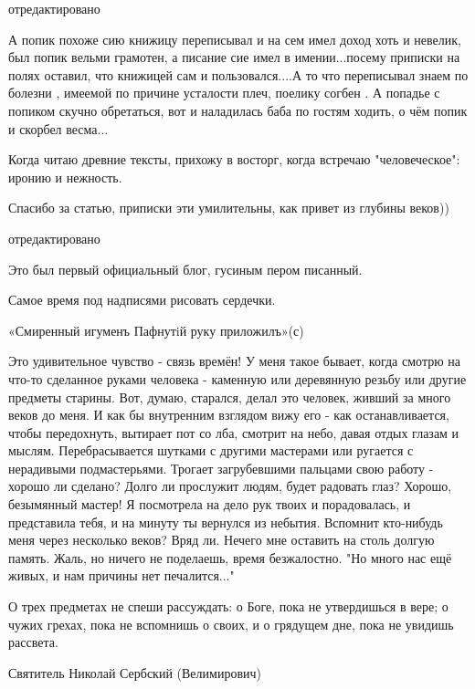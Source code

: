 \begin{itemize}
отредактировано

А попик похоже сию книжицу переписывал и на сем имел доход хоть и невелик, был
попик вельми грамотен, а писание сие имел в имении...посему
приписки на полях оставил, что книжицей сам и пользовался....А
то что переписывал знаем по болезни , имеемой по причине
усталости плеч, поелику согбен . А попадье с попиком скучно
обретаться, вот и наладилась баба по гостям ходить, о чём попик
и скорбел весма...


Когда читаю древние тексты, прихожу в восторг, когда встречаю "человеческое": иронию и нежность.


Спасибо за статью, приписки эти умилительны, как привет из глубины веков))

отредактировано

Это был первый официальный блог, гусиным пером писанный.

Самое время под надписями рисовать сердечки.


«Смиренный игуменъ Пафнутiй руку приложилъ»(с)


Это удивительное чувство - связь времён! У меня такое бывает, когда смотрю на
что-то сделанное руками человека - каменную или деревянную резьбу или другие
предметы старины. Вот, думаю, старался, делал это человек, живший за много
веков до меня. И как бы внутренним взглядом вижу его - как останавливается,
чтобы передохнуть, вытирает пот со лба, смотрит на небо, давая отдых глазам и
мыслям. Перебрасывается шутками с другими мастерами или ругается с нерадивыми
подмастерьями. Трогает загрубевшими пальцами свою работу - хорошо ли сделано?
Долго ли прослужит людям, будет радовать глаз? Хорошо, безымянный мастер! Я
посмотрела на дело рук твоих и порадовалась, и представила тебя, и на минуту ты
вернулся из небытия. Вспомнит кто-нибудь меня через несколько веков? Вряд ли.
Нечего мне оставить на столь долгую память. Жаль, но ничего не поделаешь, время
безжалостно. "Но много нас ещё живых, и нам причины нет печалится..."


О трех предметах не спеши рассуждать: о Боге, пока не утвердишься в вере; о
чужих грехах, пока не вспомнишь о своих, и о грядущем дне, пока не увидишь
рассвета.

Святитель Николай Сербский (Велимирович)


\end{itemize}
